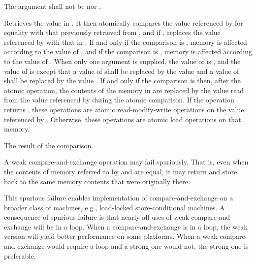\begin{itemdescr}
\pnum
\requires The  argument shall not be
 nor .

\pnum
\effects Retrieves the value in .
It then atomically compares the value referenced by  for equality
with that previously retrieved from ,
and if , replaces the value referenced by 
with that in .
If and only if the comparison is ,
memory is affected according to the value of , and
if the comparison is ,
memory is affected according to the value of .
When only one  argument is supplied,
the value of  is , and
the value of  is 
except that a value of  shall be replaced by
the value  and
a value of  shall be replaced by
the value .
If and only if the comparison is  then,
after the atomic operation,
the contents of the memory in  are replaced by
the value read from the value referenced by 
during the atomic comparison.
If the operation returns ,
these operations are atomic read-modify-write operations
on the value referenced by .
Otherwise, these operations are atomic load operations on that memory.

\pnum
\returns The result of the comparison.

\pnum
\remarks A weak compare-and-exchange operation may fail spuriously.
That is, even when the contents of memory referred to
by  and  are equal,
it may return  and
store back to  the same memory contents
that were originally there.
\begin{note}
This spurious failure enables implementation of compare-and-exchange
on a broader class of machines, e.g., load-locked store-conditional machines.
A consequence of spurious failure is
that nearly all uses of weak compare-and-exchange will be in a loop.
When a compare-and-exchange is in a loop,
the weak version will yield better performance on some platforms.
When a weak compare-and-exchange would require a loop and
a strong one would not, the strong one is preferable.
\end{note}
\end{itemdescr}

